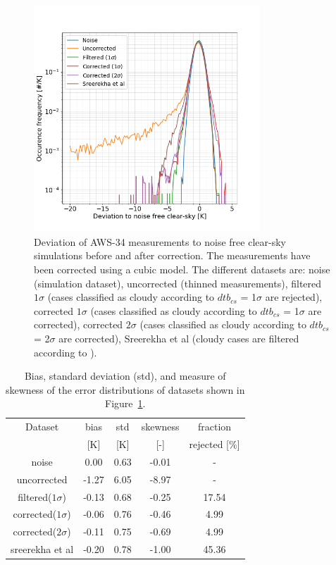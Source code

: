 \documentclass[12pt]{article}
\begin{document}
%
\begin{figure}[!tb]
	\centering
	\includegraphics[height=85mm]{PDF_corrected_AWS-34_AWS-42_thinned}
	\caption{Deviation of AWS-34 measurements to noise free clear-sky
      simulations before and after correction. The measurements have been
      corrected using a cubic model. The different datasets are: noise
      (simulation dataset), uncorrected (thinned measurements), filtered $1\sigma$ (cases classified as cloudy according to $dtb_{cs}$ = 1$\sigma$ are rejected), corrected $1\sigma$ (cases classified as cloudy according to $dtb_{cs}$ = 1$\sigma$ are corrected), corrected
      $2\sigma$ (cases classified as cloudy according to $dtb_{cs}$ = 2$\sigma$ are corrected), Sreerekha et al (cloudy cases are filtered according to \citet{rekha2012potential}).}
	\label{fig:correction:c34-42:thinned}
\end{figure}
%
\begin{table}[!tb]
	\centering
	\begin{tabular}[b]{c|c|c|c|c}
		Dataset  		  &   bias &   std &   skewness  & fraction  \\
		&   [K]  &   [K] & [-] & rejected [\%]\\
		\hline
	noise             		&   0.00 &  0.63 &              -0.01 &                - \\
	uncorrected     		&  -1.27 &  6.05 &              -8.97 &                - \\
	filtered($1\sigma$)  	&  -0.13 &  0.68 &              -0.25 &               17.54 \\
	corrected($1\sigma$) 	&  -0.06 &  0.76 &              -0.46 &                4.99 \\
	corrected($2\sigma$) 	&  -0.11 &  0.75 &              -0.69 &                4.99 \\
	sreerekha et al   		&  -0.20 &  0.78 &              -1.00 &               45.36 \\			
		\hline
\end{tabular}
\caption{Bias, standard deviation (std), and measure of skewness of the
	error distributions of datasets shown in Figure~\ref{fig:correction:c34-42:thinned}.}
\label{tab:correction:stats:34:42:thinned}
\end{table}
\end{document}
